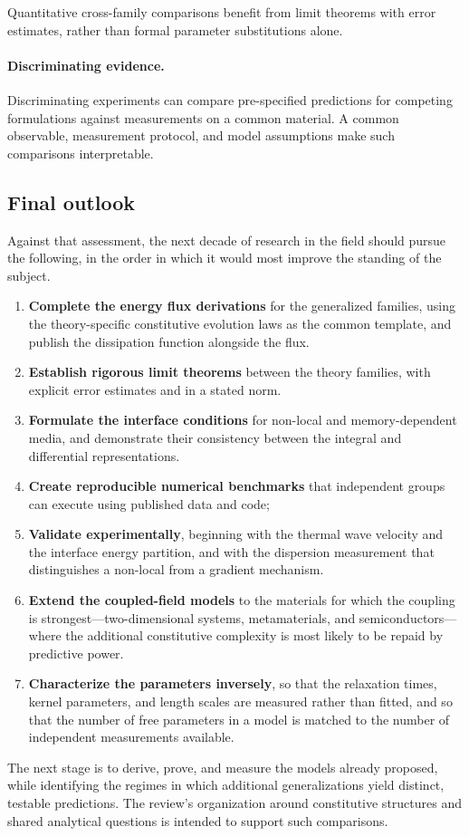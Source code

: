 Quantitative cross-family comparisons benefit from limit theorems with error estimates, rather than formal parameter substitutions alone.

\paragraph{Discriminating evidence.}

Discriminating experiments can compare pre-specified predictions for competing formulations against measurements on a common material. A common observable, measurement protocol, and model assumptions make such comparisons interpretable.

\subsection{Final outlook}

\label{sec:17.5}

Against that assessment, the next decade of research in the field should pursue the following, in the order in which it would most improve the standing of the subject.

\begin{enumerate}
\item \textbf{Complete the energy flux derivations} for the generalized families, using the theory-specific constitutive evolution laws as the common template, and publish the dissipation function alongside the flux.
\item \textbf{Establish rigorous limit theorems} between the theory families, with explicit error estimates and in a stated norm.
\item \textbf{Formulate the interface conditions} for non-local and memory-dependent media, and demonstrate their consistency between the integral and differential representations.
\item \textbf{Create reproducible numerical benchmarks} that independent groups can execute using published data and code;
\item \textbf{Validate experimentally}, beginning with the thermal wave velocity and the interface energy partition, and with the dispersion measurement that distinguishes a non-local from a gradient mechanism.
\item \textbf{Extend the coupled-field models} to the materials for which the coupling is strongest---two-dimensional systems, metamaterials, and semiconductors---where the additional constitutive complexity is most likely to be repaid by predictive power.
\item \textbf{Characterize the parameters inversely}, so that the relaxation times, kernel parameters, and length scales are measured rather than fitted, and so that the number of free parameters in a model is matched to the number of independent measurements available.
\end{enumerate}
The next stage is to derive, prove, and measure the models already proposed, while identifying the regimes in which additional generalizations yield distinct, testable predictions. The review's organization around constitutive structures and shared analytical questions is intended to support such comparisons.

